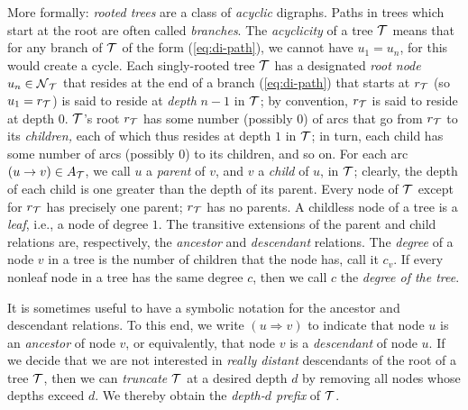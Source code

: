 \noindent {}
\bigskip

More formally: {\em rooted trees} are a class of {\em acyclic}
digraphs.  Paths in trees which start at the root are often called
{\em branches}.  The {\em acyclicity} of a tree $\mbox{$\cal T$}$ means that for
any branch of $\mbox{$\cal T$}$ of the form (\ref{eq:di-path}), we cannot have $u_1
= u_n$, for this would create a cycle.  Each singly-rooted tree $\mbox{$\cal T$}$
has a designated {\em root node}  $u_n \in
\mbox{$\cal N$}_{\mbox{{\scriptsize $\cal T$}}}$ that resides at the end of a branch (\ref{eq:di-path}) that
starts at $r_{\mbox{{\scriptsize $\cal T$}}}$ (so $u_1 = r_{\mbox{{\scriptsize $\cal T$}}}$) is said to reside at {\em
  depth} $n-1$ in $\mbox{$\cal T$}$; by convention, $r_{\mbox{{\scriptsize $\cal T$}}}$ is said to reside at
depth $0$.   $\mbox{$\cal T$}$'s
root $r_{\mbox{{\scriptsize $\cal T$}}}$ has some number (possibly $0$) of arcs that go from
$r_{\mbox{{\scriptsize $\cal T$}}}$ to its {\em children,} each of which thus resides at depth
$1$ in $\mbox{$\cal T$}$; in turn, each child has some number of arcs (possibly
$0$) to its children, and so on.  For each arc $(u \rightarrow v) \in
A_{\mbox{{\scriptsize $\cal T$}}}$, we call $u$ a {\it parent}  of $v$,
and $v$ a {\it child}  of $u$, in $\mbox{$\cal T$}$;
clearly, the depth of each child is one greater than the depth of its
parent.  Every node of $\mbox{$\cal T$}$ except for $r_{\mbox{{\scriptsize $\cal T$}}}$ has precisely one
parent; $r_{\mbox{{\scriptsize $\cal T$}}}$ has no parents.  A childless node of a tree is a
{\em leaf},  i.e., a node of degree $1$.  The
transitive extensions of the parent and child relations are,
respectively, the {\em ancestor}  and {\em
  descendant}  relations.  The {\em
  degree}  of a node $v$ in a tree
is the number of children that the node has, call it $c_v$.  If every
nonleaf node in a tree has the same degree $c$, then we call $c$ the
{\em degree of the tree}.  

It is sometimes useful to have a symbolic notation for the ancestor
and descendant relations.  To this end, we write $(u \Rightarrow v)$
 to
indicate that node $u$ is an {\it ancestor} of node $v$, or
equivalently, that node $v$ is a {\it descendant} of node $u$.  If we
decide that we are not interested in {\em really distant} descendants
of the root of a tree $\mbox{$\cal T$}$, then we can {\em truncate} 
$\mbox{$\cal T$}$ at a desired depth $d$ by removing all nodes whose depths exceed
$d$.  We thereby obtain the {\em depth-$d$ prefix} of $\mbox{$\cal T$}$.

